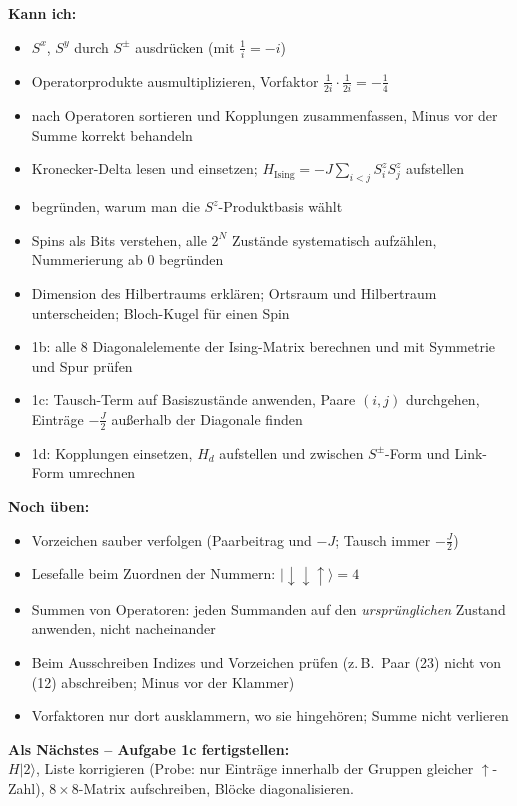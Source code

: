 \documentclass[11pt,a4paper]{article}
\newcommand{\ket}[1]{\lvert #1\rangle}
\newcommand{\up}{{\uparrow}}
\newcommand{\dn}{{\downarrow}}
\begin{document}
\textbf{Kann ich:}
\begin{itemize}[itemsep=1pt]
\item $S^x$, $S^y$ durch $S^\pm$ ausdrücken (mit $\tfrac1i=-i$)
\item Operatorprodukte ausmultiplizieren, Vorfaktor $\tfrac{1}{2i}\cdot\tfrac{1}{2i} = -\tfrac14$
\item nach Operatoren sortieren und Kopplungen zusammenfassen, Minus vor der Summe korrekt behandeln
\item Kronecker-Delta lesen und einsetzen; $H_\text{Ising} = -J\sum_{i<j}S^z_iS^z_j$ aufstellen
\item begründen, warum man die $S^z$-Produktbasis wählt
\item Spins als Bits verstehen, alle $2^N$ Zustände systematisch aufzählen, Nummerierung ab 0 begründen
\item Dimension des Hilbertraums erklären; Ortsraum und Hilbertraum unterscheiden; Bloch-Kugel für einen Spin
\item 1b: alle 8 Diagonalelemente der Ising-Matrix berechnen und mit Symmetrie und Spur prüfen
\item 1c: Tausch-Term auf Basiszustände anwenden, Paare $(i,j)$ durchgehen, Einträge $-\tfrac J2$ außer\-halb der Diagonale finden
\item 1d: Kopplungen einsetzen, $H_d$ aufstellen und zwischen $S^\pm$-Form und Link-Form umrechnen
\end{itemize}

\textbf{Noch üben:}
\begin{itemize}[itemsep=1pt]
\item Vorzeichen sauber verfolgen (Paarbeitrag und $-J$; Tausch immer $-\tfrac J2$)
\item Lesefalle beim Zuordnen der Nummern: $\ket{\dn\dn\up}=4$
\item Summen von Operatoren: jeden Summanden auf den \emph{ursprünglichen} Zustand anwenden, nicht nacheinander
\item Beim Ausschreiben Indizes und Vorzeichen prüfen (z.\,B.\ Paar (23) nicht von (12) abschreiben; Minus vor der Klammer)
\item Vorfaktoren nur dort ausklammern, wo sie hingehören; Summe nicht verlieren
\end{itemize}

\textbf{Als Nächstes -- Aufgabe 1c fertigstellen:}\\ $H\ket2$, Liste korrigieren (Probe: nur Einträge innerhalb der Gruppen gleicher $\up$-Zahl), $8\times8$-Matrix aufschreiben, Blöcke diagonalisieren.
\end{document}
